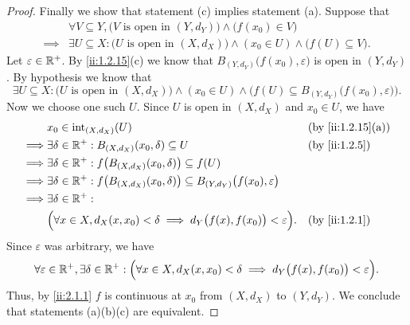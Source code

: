 \begin{proof}
  Finally we show that statement (c) implies statement (a).
  Suppose that
  \begin{align*}
             & \forall V \subseteq Y, \big(V \text{ is open in } (Y, d_Y)\big) \land \big(f(x_0) \in V\big)                         \\
    \implies & \exists U \subseteq X : \big(U \text{ is open in } (X, d_X)\big) \land (x_0 \in U) \land \big(f(U) \subseteq V\big).
  \end{align*}
  Let \(\varepsilon \in \mathbb{R}^+\).
  By \cref{ii:1.2.15}(c) we know that \(B_{(Y, d_Y)}\big(f(x_0), \varepsilon\big)\) is open in \((Y, d_Y)\).
  By hypothesis we know that
  \[
    \exists U \subseteq X : \big(U \text{ is open in } (X, d_X)\big) \land (x_0 \in U) \land \Big(f(U) \subseteq B_{(Y, d_Y)}\big(f(x_0), \varepsilon\big)\Big).
  \]
  Now we choose one such \(U\).
  Since \(U\) is open in \((X, d_X)\) and \(x_0 \in U\), we have
  \begin{align*}
             & x_0 \in \text{int}_{(X, d_X)}(U)                                                                                   &  & \by{ii:1.2.15}[a] \\
    \implies & \exists \delta \in \R^+ : B_{(X, d_X)}(x_0, \delta) \subseteq U                                                    &  & \by{ii:1.2.5}     \\
    \implies & \exists \delta \in \R^+ : f\big(B_{(X, d_X)}(x_0, \delta)\big) \subseteq f(U)                                                             \\
    \implies & \exists \delta \in \R^+ : f\big(B_{(X, d_X)}(x_0, \delta)\big) \subseteq B_{(Y, d_Y)}\big(f(x_0), \varepsilon\big)                        \\
    \implies & \exists \delta \in \R^+ :                                                                                                                 \\
             & \Big(\forall x \in X, d_X(x, x_0) < \delta \implies d_Y\big(f(x), f(x_0)\big) < \varepsilon\Big).                  &  & \by{ii:1.2.1}
  \end{align*}
  Since \(\varepsilon\) was arbitrary, we have
  \[
    \forall \varepsilon \in \mathbb{R}^+, \exists \delta \in \mathbb{R}^+ : \Big(\forall x \in X, d_X(x, x_0) < \delta \implies d_Y\big(f(x), f(x_0)\big) < \varepsilon\Big).
  \]
  Thus, by \cref{ii:2.1.1} \(f\) is continuous at \(x_0\) from \((X, d_X)\) to \((Y, d_Y)\).
  We conclude that statements (a)(b)(c) are equivalent.
\end{proof}

